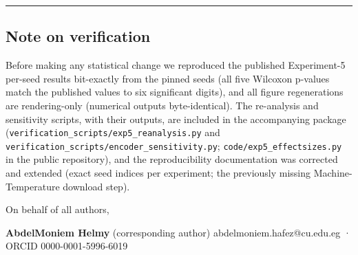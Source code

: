 \documentclass[
  11pt,
]{article}
\begin{document}
\begin{center}\rule{0.5\linewidth}{0.5pt}\end{center}

\subsection{Note on verification}\label{note-on-verification}

Before making any statistical change we reproduced the published
Experiment-5 per-seed results bit-exactly from the pinned seeds (all
five Wilcoxon p-values match the published values to six significant
digits), and all figure regenerations are rendering-only (numerical
outputs byte-identical). The re-analysis and sensitivity scripts, with
their outputs, are included in the accompanying package
(\texttt{verification\_scripts/exp5\_reanalysis.py} and
\texttt{verification\_scripts/encoder\_sensitivity.py};
\texttt{code/exp5\_effectsizes.py} in the public repository), and the
reproducibility documentation was corrected and extended (exact seed
indices per experiment; the previously missing Machine-Temperature
download step).

On behalf of all authors,

\textbf{AbdelMoniem Helmy} (corresponding author)
abdelmoniem.hafez@cu.edu.eg · ORCID 0000-0001-5996-6019
\end{document}
